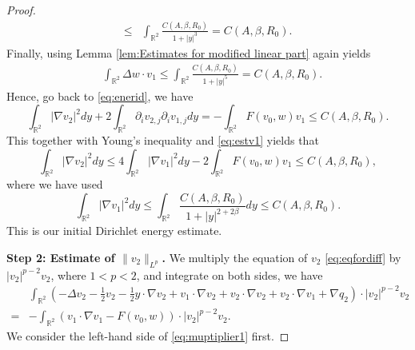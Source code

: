 \documentclass[12pt]{amsart}
\numberwithin{equation}{section}              %
\theoremstyle{remark}
\begin{document}
\begin{proof}
\begin{equation*}
\begin{aligned}
					\leq & \int_{\mathbb{R}^2} \frac{C(A,\beta, R_0)}{1+|y|^3} = C(A,\beta,R_0).
				\end{aligned}
			\end{equation*}
			Finally, using Lemma \ref{lem:Estimates for modified linear part} again yields
			\begin{equation*}
				\begin{aligned}
					&\int_{\mathbb{R}^2} \Delta w \cdot v_1 \leq  \int_{\mathbb{R}^2} \frac{C(A,\beta,R_0)}{1+|y|^5} = C(A,\beta, R_0).
				\end{aligned}
			\end{equation*}
			Hence, go back to \eqref{eq:enerid}, we have
			\begin{equation*}
				\int_{\mathbb{R}^2} |\nabla v_2|^2 dy + 2\int_{\mathbb{R}^2} \partial_i v_{2,j} \partial_i v_{1,j} dy=-\int_{\mathbb{R}^2} F(v_0,w) v_1\leq C(A,\beta, R_0).
			\end{equation*}
			This together with  Young's inequality and \eqref{eq:estv1} yields that
			\begin{equation}\label{eq:gradientest}
				\int_{\mathbb{R}^2} |\nabla v_2|^2 dy \leq 4 \int_{\mathbb{R}^2} |\nabla  v_1|^2dy-2\int_{\mathbb{R}^2} F(v_0,w) v_1\leq C(A,\beta, R_0),
			\end{equation}
			where we have used
			\begin{equation}\label{eq:Ditrichelten}
			\int_{\mathbb{R}^2} |\nabla  v_1|^2dy \leq \int_{\mathbb{R}^2}  \frac{C(A,\beta, R_0)}{1+|y|^{2+2\beta}} dy \leq C(A, \beta, R_0).
			\end{equation}
			This is our initial Dirichlet energy estimate. 
			
			\textbf{Step 2: Estimate of 	$\|v_2\|_{L^{p}}$.}
			We multiply the equation of $v_2$ \eqref{eq:eqfordiff} by $|v_2|^{p-2}v_2$, where $1<p<2$, and integrate on both sides, we have
			\begin{equation}\label{eq:muptiplier1}
				\begin{aligned}
					& \int_{\mathbb{R}^2} \left(	-\Delta v_2 -\frac{1}{2}v_2 -\frac{1}{2}y\cdot \nabla v_2+  v_1\cdot \nabla v_2 +v_2\cdot \nabla v_2  + v_2\cdot \nabla  v_1 +\nabla q_2 \right) \cdot |v_2|^{p-2}v_2\\
					= &-\int_{\mathbb{R}^2}  \left( v_1\cdot\nabla  v_1 - F(v_0,w) \right)\cdot  |v_2|^{p-2}v_2.	
				\end{aligned}
			\end{equation}
			We consider the left-hand side of \eqref{eq:muptiplier1} first.
            

\end{proof}
\end{document}
